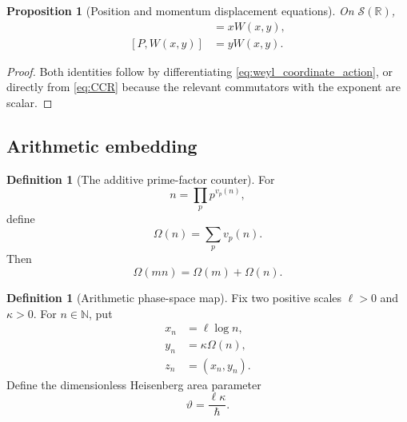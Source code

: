 \documentclass[11pt]{amsart}
\numberwithin{equation}{section}
\theoremstyle{plain}
\newtheorem{proposition}[theorem]{Proposition}
\theoremstyle{definition}
\newtheorem{definition}[theorem]{Definition}
\theoremstyle{remark}
\newcommand{\R}{\mathbb{R}}
\newcommand{\N}{\mathbb{N}}
\newcommand{\Sch}{\mathcal{S}}
\newcommand{\Om}{\Omega}
\begin{document}
\begin{proposition}[Position and momentum displacement equations]
\label{prop:weyl_QP_commutators}
On $\Sch(\R)$,
\begin{align}
[Q,W(x,y)]
&=xW(x,y),
\label{eq:Q_W_commutator}\\
[P,W(x,y)]
&=yW(x,y).
\label{eq:P_W_commutator}
\end{align}
\end{proposition}

\begin{proof}
Both identities follow by differentiating \eqref{eq:weyl_coordinate_action},
or directly from \eqref{eq:CCR} because the relevant commutators with the
exponent are scalar.
\end{proof}

\subsection{Arithmetic embedding}
\label{subsec:arithmetic_embedding}

\begin{definition}[The additive prime-factor counter]
\label{def:Omega}
For
\begin{equation}
n=\prod_p p^{v_p(n)},
\label{eq:prime_factorization}
\end{equation}
define
\begin{equation}
\Om(n)=\sum_p v_p(n).
\label{eq:Omega_definition}
\end{equation}
Then
\begin{equation}
\Om(mn)=\Om(m)+\Om(n).
\label{eq:Omega_additivity}
\end{equation}
\end{definition}

\begin{definition}[Arithmetic phase-space map]
\label{def:arithmetic_phase_space_map}
Fix two positive scales $\ell>0$ and $\kappa>0$.  For $n\in\N$, put
\begin{align}
x_n
&=\ell\log n,
\label{eq:xn_definition}\\
y_n
&=\kappa\Om(n),
\label{eq:yn_definition}\\
z_n
&=(x_n,y_n).
\label{eq:zn_definition}
\end{align}
Define the dimensionless Heisenberg area parameter
\begin{equation}
\vartheta=\frac{\ell\kappa}{\hbar}.
\label{eq:theta_definition}
\end{equation}
\end{definition}
\end{document}
